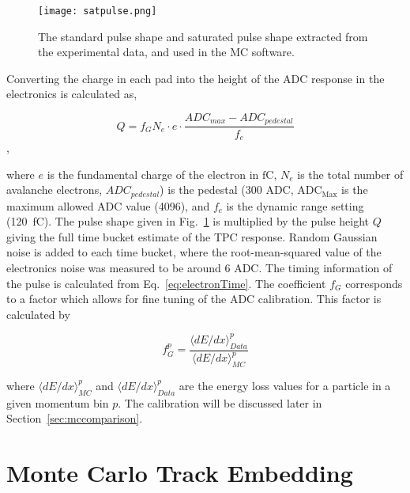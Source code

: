 \begin{figure}[!htb]
    \centering       
    \texttt{[image: satpulse.png]} 
    \caption{The standard pulse shape and saturated pulse shape extracted from the experimental data, and used in the MC software.}
    \label{fig:pulseshape}
\end{figure}


Converting the charge in each pad into the height of the ADC response in the electronics is calculated as, 

\begin{equation}
Q = f_G  N_{e}  \cdot e \cdot\frac{ADC_{max} - ADC_{pedestal}}{f_c}
\label{eq:etoADC}
\end{equation},

where $e$ is the fundamental charge of the electron in $\si{\femto \coulomb}$, $N_{e}$ is the total number of avalanche electrons, $ADC_{pedestal}$) is the pedestal (300 ADC, $\mathrm{ADC_{Max}}$ is the maximum allowed ADC value (4096), and $f_c$ is the dynamic range setting (\SI{120}{\femto\coulomb}). The pulse shape given in Fig.~\ref{fig:pulseshape} is multiplied by the pulse height $Q$ giving the full time bucket estimate of the TPC response. Random Gaussian noise is added to each time bucket, where the root-mean-squared value of the electronics noise was measured to be around 6 ADC. The timing information of the pulse is calculated from Eq.~\ref{eq:electronTime}. The coefficient $f_G$ corresponds to a factor which allows for fine tuning of the ADC calibration. This factor is calculated by

\begin{equation}
f_G^p = \frac{\langle dE/dx\rangle_{Data}^p}{\langle dE/dx\rangle_{MC}^p}
\label{eq:dedxcalibration}
\end{equation}

where $\langle dE/dx\rangle_{MC}^p$ and $\langle dE/dx\rangle_{Data}^p$  are the energy loss values for a particle in a given momentum bin $p$. The calibration will be discussed later in Section~\ref{sec:mccomparison}.


\section{Monte Carlo Track Embedding}
\label{sec:embedding}

